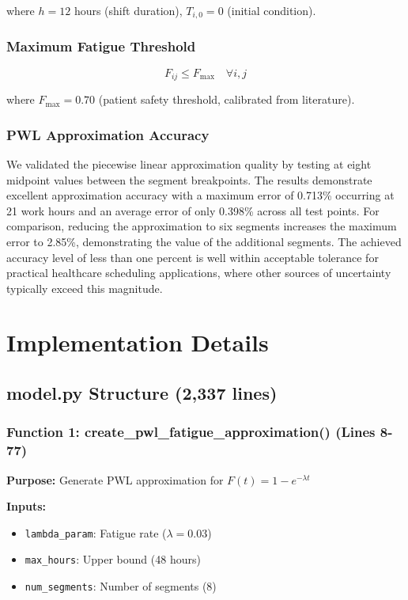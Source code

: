 \documentclass[11pt,letterpaper]{article}
\begin{document}
where $h = 12$ hours (shift duration), $T_{i,0} = 0$ (initial condition).

\subsubsection{Maximum Fatigue Threshold}
\begin{equation}
F_{ij} \leq F_{\max} \quad \forall i, j \tag{F6}
\end{equation}

where $F_{\max} = 0.70$ (patient safety threshold, calibrated from literature).

\subsubsection{PWL Approximation Accuracy}
We validated the piecewise linear approximation quality by testing at eight midpoint values between the segment breakpoints. The results demonstrate excellent approximation accuracy with a maximum error of 0.713\% occurring at 21 work hours and an average error of only 0.398\% across all test points. For comparison, reducing the approximation to six segments increases the maximum error to 2.85\%, demonstrating the value of the additional segments. The achieved accuracy level of less than one percent is well within acceptable tolerance for practical healthcare scheduling applications, where other sources of uncertainty typically exceed this magnitude.

\section{Implementation Details}

\subsection{model.py Structure (2,337 lines)}

\subsubsection{Function 1: create\_pwl\_fatigue\_approximation() (Lines 8-77)}
\textbf{Purpose:} Generate PWL approximation for $F(t) = 1 - e^{-\lambda t}$

\textbf{Inputs:}
\begin{itemize}[leftmargin=*]
    \item \texttt{lambda\_param}: Fatigue rate ($\lambda = 0.03$)
    \item \texttt{max\_hours}: Upper bound (48 hours)
    \item \texttt{num\_segments}: Number of segments (8)
\end{itemize}
\end{document}
